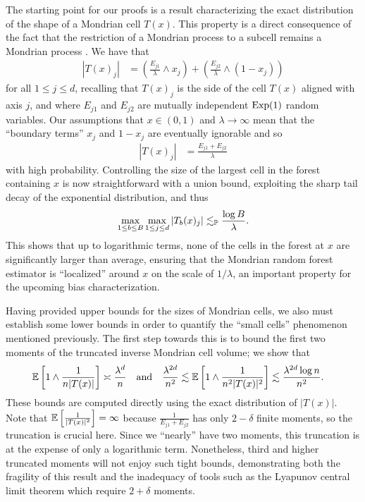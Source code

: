 The starting point for our proofs is a result characterizing
the exact distribution of the shape of a Mondrian cell $T(x)$.
This property is a direct consequence of the fact that the restriction of a
Mondrian process to a subcell remains a Mondrian process
\citep{mourtada2020minimax}.
We have that
%
\begin{align*}
  |T(x)_j|
  &= \left( \frac{E_{j1}}{\lambda} \wedge x_j \right)
  + \left( \frac{E_{j2}}{\lambda} \wedge (1-x_j) \right)
\end{align*}
%
for all $1 \leq j \leq d$,
recalling that $T(x)_j$ is the side of the cell $T(x)$
aligned with axis $j$,
and where $E_{j1}$ and $E_{j2}$
are mutually independent $\Exp(1)$ random variables.
Our assumptions that $x \in (0,1)$ and $\lambda \to \infty$
mean that the ``boundary terms'' $x_j$ and $1-x_j$ are
eventually ignorable and so
%
\begin{align*}
  |T(x)_j|
  &= \frac{E_{j1} + E_{j2}}{\lambda}
\end{align*}
%
with high probability.
Controlling the size of the largest cell in the forest
containing $x$ is now straightforward with a union
bound, exploiting the sharp tail decay of the
exponential distribution, and thus
%
\begin{align*}
  \max_{1 \leq b \leq B}
  \max_{1 \leq j \leq d}
  |T_b(x)_j|
  \lesssim_\P \frac{\log B}{\lambda}.
\end{align*}
%
This shows that up to logarithmic terms, none of the cells
in the forest at $x$ are significantly larger than average,
ensuring that the Mondrian random forest estimator is
``localized'' around $x$ on the scale of $1/\lambda$,
an important property for the upcoming bias
characterization.

Having provided upper bounds for the sizes of Mondrian cells,
we also must establish some lower bounds in order to
quantify the ``small cells'' phenomenon mentioned previously.
The first step towards this is to bound the first two moments
of the truncated inverse Mondrian cell volume; we show that
%
\begin{align*}
  \E\left[
    1 \wedge
    \frac{1}{n |T(x)|}
  \right]
  &\asymp
  \frac{\lambda^d}{n}
  &&\text{and}
  &\frac{\lambda^{2d}}{n^2}
  &\lesssim
  \E\left[
    1 \wedge
    \frac{1}{n^2 |T(x)|^2}
  \right]
  \lesssim
  \frac{\lambda^{2d} \log n}{n^2}.
\end{align*}
%
These bounds are computed directly using the exact distribution of $|T(x)|$.
Note that $\E\left[ \frac{1}{|T(x)|^2} \right] = \infty$ because
$\frac{1}{E_{j1} + E_{j2}}$ has only $2 - \delta$ finite moments,
so the truncation is crucial here.
Since we ``nearly'' have two moments, this truncation is
at the expense of only a logarithmic term.
Nonetheless, third and higher truncated moments will not enjoy such tight
bounds, demonstrating both the fragility of this result and
the inadequacy of
tools such as the Lyapunov central limit theorem which require
$2 + \delta$ moments.

